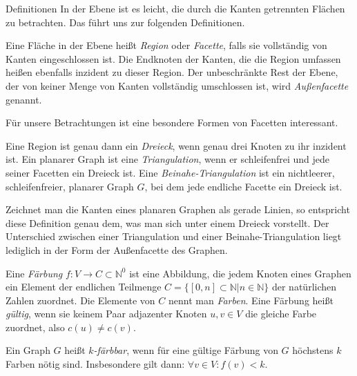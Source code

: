 \begin{chapter}{Definitionen}
  In der Ebene ist es leicht, die durch die Kanten getrennten Flächen zu betrachten. Das führt uns zur folgenden Definitionen.
  
  \begin{definition}
   Eine Fläche in der Ebene heißt \textit{Region} oder \textit{Facette}, falls sie vollständig von Kanten eingeschlossen ist. Die Endknoten der Kanten, die die Region umfassen heißen ebenfalls inzident zu dieser Region. Der unbeschränkte Rest der Ebene, der von keiner Menge von Kanten vollständig umschlossen ist, wird \textit{Außenfacette} genannt.
  \end{definition}
  
  Für unsere Betrachtungen ist eine besondere Formen von Facetten interessant. 
  
  \begin{definition}
   Eine Region ist genau dann ein \textit{Dreieck}, wenn genau drei Knoten zu ihr inzident ist. Ein planarer Graph ist eine \textit{Triangulation}, wenn er schleifenfrei und jede seiner Facetten ein Dreieck ist. Eine \textit{Beinahe-Triangulation} ist ein nichtleerer, schleifenfreier, planarer Graph $G$, bei dem jede endliche Facette ein Dreieck ist. 
  \end{definition}
  
  Zeichnet man die Kanten eines planaren Graphen als gerade Linien, so entspricht diese Definition genau dem, was man sich unter einem Dreieck vorstellt. Der Unterschied zwischen einer Triangulation und einer Beinahe-Triangulation liegt lediglich in der Form der Außenfacette des Graphen. 
  
  \begin{definition}
   Eine \textit{Färbung} $f: V \rightarrow C \subset \mathbb{N}^0$ ist eine Abbildung, die jedem Knoten eines Graphen ein Element der endlichen Teilmenge $C = \{[0,n] \subset \mathbb{N}| n \in \mathbb{N}\}$ der natürlichen Zahlen zuordnet. Die Elemente von $C$ nennt man \textit{Farben}. Eine Färbung heißt \textit{gültig}, wenn sie keinem Paar adjazenter Knoten $u,v \in V$ die gleiche Farbe zuordnet, also $c(u) \neq c(v)$. 
  \end{definition}
  
  \begin{definition}[$k$-Färbbarkeit]
   Ein Graph $G$ heißt \textit{$k$-färbbar}, wenn für eine gültige Färbung von $G$ höchstens $k$ Farben nötig sind. Insbesondere gilt dann: $\forall v \in V: f(v) < k$.
  \end{definition}
  

\end{chapter}
